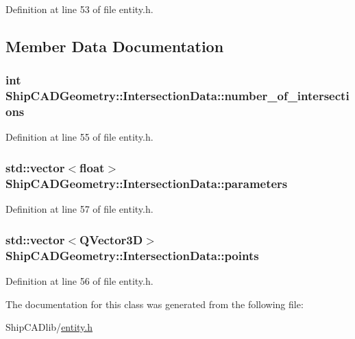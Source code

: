 Definition at line 53 of file entity.\-h.



\subsection{Member Data Documentation}
\hypertarget{classShipCADGeometry_1_1IntersectionData_aff8a7bad6b802779c437df8b558be993}{
\subsubsection[{number\-\_\-of\-\_\-intersections}]{\setlength{\rightskip}{0pt plus 5cm}int Ship\-C\-A\-D\-Geometry\-::\-Intersection\-Data\-::number\-\_\-of\-\_\-intersections}}\label{classShipCADGeometry_1_1IntersectionData_aff8a7bad6b802779c437df8b558be993}


Definition at line 55 of file entity.\-h.

\hypertarget{classShipCADGeometry_1_1IntersectionData_ac67f35f563f7c8f4dc7b1096e3ca8439}{
\subsubsection[{parameters}]{\setlength{\rightskip}{0pt plus 5cm}std\-::vector$<$float$>$ Ship\-C\-A\-D\-Geometry\-::\-Intersection\-Data\-::parameters}}\label{classShipCADGeometry_1_1IntersectionData_ac67f35f563f7c8f4dc7b1096e3ca8439}


Definition at line 57 of file entity.\-h.

\hypertarget{classShipCADGeometry_1_1IntersectionData_a7e38232a1c2af3ab1abff06ea87e9e8e}{
\subsubsection[{points}]{\setlength{\rightskip}{0pt plus 5cm}std\-::vector$<$Q\-Vector3\-D$>$ Ship\-C\-A\-D\-Geometry\-::\-Intersection\-Data\-::points}}\label{classShipCADGeometry_1_1IntersectionData_a7e38232a1c2af3ab1abff06ea87e9e8e}


Definition at line 56 of file entity.\-h.



The documentation for this class was generated from the following file\-:\begin{DoxyCompactItemize}
\item 
Ship\-C\-A\-Dlib/\hyperlink{entity_8h}{entity.\-h}\end{DoxyCompactItemize}
